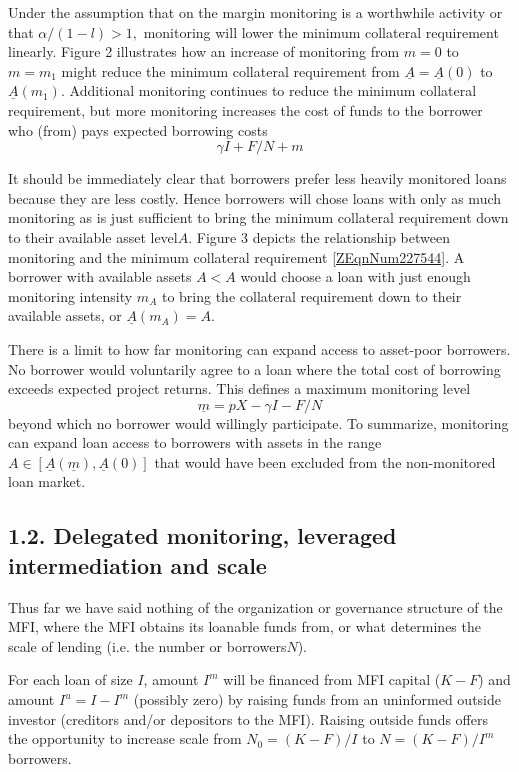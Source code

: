 \documentclass{article} %
\begin{document}
Under the assumption that on the margin monitoring is a worthwhile activity or that $\alpha /(1-l)>1,$ monitoring will lower the minimum collateral requirement linearly.  Figure 2 illustrates how an increase of monitoring from $m=0$ to $m=m_{1} $ might reduce the minimum collateral requirement from $\underline{A}=\underline{A}(0)$ to $\underline{A}(m_{1} ).$ Additional monitoring continues to reduce the minimum collateral requirement, but more monitoring increases the cost of funds to the borrower who (from) pays expected borrowing costs
\[\gamma I+F/N+m\] 

It should be immediately clear that borrowers prefer less heavily monitored loans because they are less costly.  Hence borrowers will chose loans with only as much monitoring as is just sufficient to bring the minimum collateral requirement down to their available asset level$A$.  Figure 3 depicts the relationship between monitoring and the minimum collateral requirement \eqref{ZEqnNum227544}. A borrower with available assets $A<$$A$ would choose a loan with just enough monitoring intensity $m_{A} $ to bring the collateral requirement down to their available assets, or $\underline{A}(m_{A} )=A.$ 

There is a limit to how far monitoring can expand access to asset-poor borrowers.  No borrower would voluntarily agree to a loan where the total cost of borrowing exceeds expected project returns.  This defines a maximum monitoring level
\begin{equation} \label{8)} 
\underline{m}=pX-\gamma I-F/N 
\end{equation} 
beyond which no borrower would willingly participate$.$  To summarize, monitoring can expand loan access to borrowers with assets in the range $A\in [\underline{A}(\underline{m}),\underline{A}(0)]$ that would have been excluded from the non-monitored loan market. 

\noindent 
\subsection{1.2. Delegated monitoring, leveraged intermediation and scale}

Thus far we have said nothing of the organization or governance structure of the MFI, where the MFI obtains its loanable funds from, or what determines the scale of lending (i.e. the number or borrowers$N$).  

For each loan of size $I$, amount $I^{m} $ will be financed from MFI capital ($K-F$) and amount $I^{u} =I-I^{m} $ (possibly zero) by raising funds from an uninformed outside investor (creditors and/or depositors to the MFI).  Raising outside funds offers the opportunity to increase scale from $N_{0} =(K-F)/I$ to $N=(K-F)/I^{m} $ borrowers.   
\end{document}
